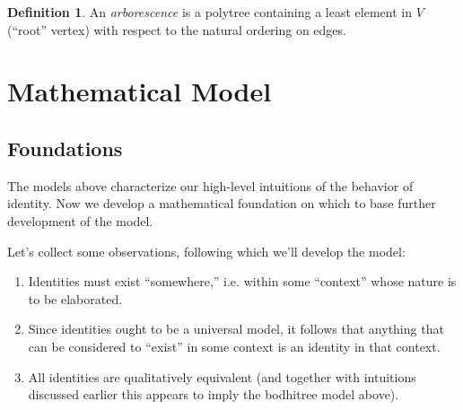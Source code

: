 \documentclass[pra,twocolumn,groupedaddress,10pt]{revtex4}
\theoremstyle{definition}
\newtheorem{defn}{Definition}[section]
\begin{document}
\begin{defn}
	An \emph{arborescence} is a polytree containing a least element in $V$ (``root'' vertex) with respect to the natural ordering on edges.
\end{defn}

\section{Mathematical Model} \label{sec:matmod}

\subsection{Foundations} \label{sec:foundations}

The models above characterize our high-level intuitions of the behavior of identity. Now we develop a mathematical foundation on which to base further development of the model.

Let's collect some observations, following which we'll develop the model:

\begin{enumerate}
	\item Identities must exist ``somewhere,'' i.e. within some ``context'' whose nature is to be elaborated.
	\item Since identities ought to be a universal model, it follows that anything that can be considered to ``exist'' in some context is an identity in that context.
	\item All identities are qualitatively equivalent (and together with intuitions discussed earlier this appears to imply the bodhitree model above).
\end{enumerate}
\end{document}

